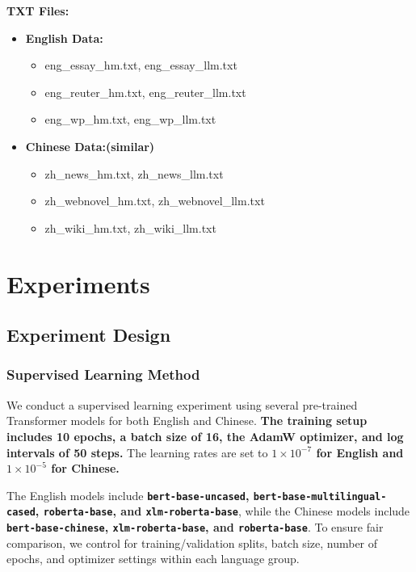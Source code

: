 \documentclass[lettersize,journal]{IEEEtran}
\begin{document}
\textbf{TXT Files:}
\begin{itemize}
  \item \textbf{English Data:}
  \begin{itemize}
    \item eng\_essay\_hm.txt, eng\_essay\_llm.txt
    \item eng\_reuter\_hm.txt, eng\_reuter\_llm.txt
    \item eng\_wp\_hm.txt, eng\_wp\_llm.txt
  \end{itemize}
  \item \textbf{Chinese Data:(similar)}
  \begin{itemize}
    \item zh\_news\_hm.txt, zh\_news\_llm.txt
    \item zh\_webnovel\_hm.txt, zh\_webnovel\_llm.txt
    \item zh\_wiki\_hm.txt, zh\_wiki\_llm.txt
  \end{itemize}
\end{itemize}



\section{Experiments}
\subsection{Experiment Design}
\subsubsection{Supervised Learning Method}\par
We conduct a supervised learning experiment using several pre-trained Transformer models for both English and Chinese. \textbf{The training setup includes 10 epochs, a batch size of 16, the AdamW optimizer, and log intervals of 50 steps.} The learning rates are set to \textbf{\(1 \times 10^{-7}\) for English and \(1 \times 10^{-5}\) for Chinese. }

The English models include \textbf{\texttt{bert-base-uncased}, \texttt{bert-base-multilingual-cased}, \texttt{roberta-base}, and \texttt{xlm-roberta-base}}, while the Chinese models include \textbf{\texttt{bert-base-chinese}, \texttt{xlm-roberta-base}, and \texttt{roberta-base}}. To ensure fair comparison, we control for training/validation splits, batch size, number of epochs, and optimizer settings within each language group. 
\end{document}
